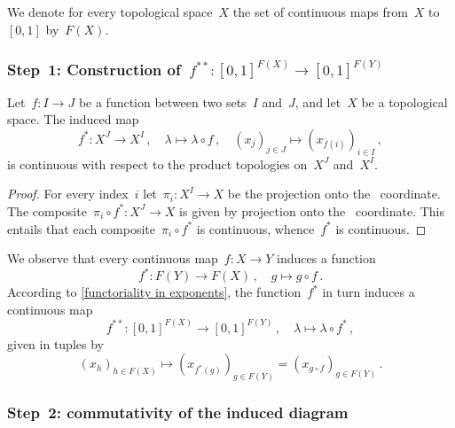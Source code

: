 \subsection{}

We denote for every topological space~$X$ the set of continuous maps from~$X$ to~$[0, 1]$ by~$F(X)$.



\subsubsection*{Step~1: Construction of~$f^{**} \colon [0, 1]^{F(X)} \to [0, 1]^{F(Y)}$}

\begin{lemma}
	\label{functoriality in exponents}
	Let~$f \colon I \to J$ be a function between two sets~$I$ and~$J$, and let~$X$ be a topological space.
	The induced map
	\[
		f^*
		\colon
		X^J \to X^I \,,
		\quad
		λ \mapsto λ ∘ f \,,
		\quad
		(x_j)_{j ∈ J} \mapsto (x_{f(i)})_{i ∈ I} \,,
	\]
	is continuous with respect to the product topologies on~$X^J$ and~$X^I$.
\end{lemma}

\begin{proof}
	For every index~$i$ let~$π_i \colon X^I \to X$ be the projection onto the~ coordinate.
	The composite~$π_i ∘ f^* \colon X^J \to X$ is given by projection onto the~ coordinate.
	This entails that each composite~$π_i ∘ f^*$ is continuous, whence~$f^*$ is continuous.
\end{proof}

We observe that every continuous map~$f \colon X \to Y$ induces a function
\[
	f^*
	\colon
	F(Y) \to F(X) \,,
	\quad
	g \mapsto g ∘ f \,.
\]
According to \cref{functoriality in exponents}, the function~$f^*$ in turn induces a continuous map
\[
	f^{**}
	\colon
	[0, 1]^{F(X)} \to [0, 1]^{F(Y)} \,,
	\quad
	λ \mapsto λ ∘ f^* \,,
\]
given in tuples by
\[
	(x_h)_{h ∈ F(X)} \mapsto (x_{f^*(g)})_{g ∈ F(Y)} = (x_{g ∘ f})_{g ∈ F(Y)} \,.
\]



\subsubsection*{Step~2: commutativity of the induced diagram}

